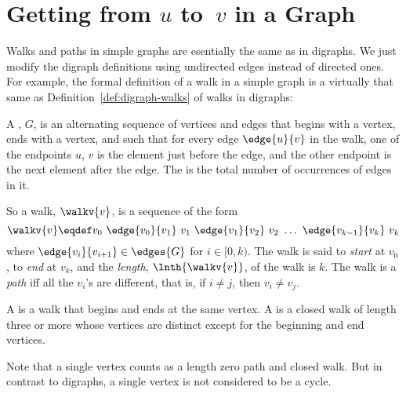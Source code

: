 \begin{problems}
\classproblems
{}

\homeworkproblems
{}

\examproblems
{}

\end{problems}



\section{Getting from $u$ to~$v$ in a Graph}\label{sec:connectedness}

Walks and paths in simple graphs are esentially the same as in digraphs.
We just modify the digraph definitions using undirected edges instead of directed
ones.  For example, the formal definition of a walk in a simple graph is a virtually
that same as Definition~\ref{def:digraph-walks} of walks in digraphs:

\begin{definition}\label{def:simplegraph-walks}
A , $G$, is an alternating sequence of
vertices and edges that begins with a vertex, ends with a vertex, and
such that for every edge $\edge{u}{v}$ in the walk, one of the
endpoints $u$, $v$ is the element just before the edge, and the other
endpoint is the next element after the edge.  The  is the total number of occurrences of edges in it.

So a walk, $\walkv{v}$, is a sequence of the form
\[
\walkv{v} \eqdef v_0\ \edge{v_0}{v_1}\
v_1\  \edge{v_1}{v_2}\  v_2\  \dots\  \edge{v_{k-1}}{v_k}\  v_k
\]
where $\edge{v_i}{v_{i+1}} \in \edges{G}$ for $i \in [0,k)$.
  The walk is said to \emph{start} at $v_0$, to \emph{end} at $v_k$,
  and the \emph{length}, $\lnth{\walkv{v}}$, of the walk is
  $k$.  The walk is a \emph{path} iff all the $v_i$'s are different,
  that is, if $i \neq j$, then $v_i \neq v_j$.

A  is a walk that begins and ends at the same
vertex.  A  is a closed walk of length three or more whose
vertices are distinct except for the beginning and end vertices.
\end{definition}
Note that a single vertex counts as a length zero path and closed
walk.  But in contrast to digraphs, a single vertex is not considered
to be a cycle.

